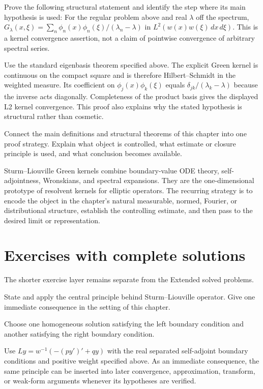 \begin{problem}\label{prob:iii26-problem-11}
Prove the following structural statement and identify the step where its main hypothesis is used: For the regular problem above and real $\lambda$ off the spectrum, $G_\lambda(x,\xi)=\sum_n\phi_n(x)\phi_n(\xi)/(\lambda_n-\lambda)$ in $L^2(w(x)w(\xi)\,dx\,d\xi)$. This is a kernel convergence assertion, not a claim of pointwise convergence of arbitrary spectral series.
\end{problem}
\begin{solution}
Use the standard eigenbasis theorem specified above. The explicit Green kernel is continuous on the compact square and is therefore Hilbert--Schmidt in the weighted measure. Its coefficient on $\phi_j(x)\phi_k(\xi)$ equals $\delta_{jk}/(\lambda_k-\lambda)$ because the inverse acts diagonally. Completeness of the product basis gives the displayed L2 kernel convergence. This proof also explains why the stated hypothesis is structural rather than cosmetic.
\end{solution}

\begin{problem}\label{prob:iii26-problem-12}
Connect the main definitions and structural theorems of this chapter into one proof strategy. Explain what object is controlled, what estimate or closure principle is used, and what conclusion becomes available.
\end{problem}
\begin{solution}
Sturm--Liouville Green kernels combine boundary-value ODE theory, self-adjointness, Wronskians, and spectral expansions. They are the one-dimensional prototype of resolvent kernels for elliptic operators. The recurring strategy is to encode the object in the chapter's natural measurable, normed, Fourier, or distributional structure, establish the controlling estimate, and then pass to the desired limit or representation.
\end{solution}
\section{Exercises with complete solutions}
The shorter exercise layer remains separate from the Extended solved problems.

\begin{exercise}\label{exr:iii26-01}
State and apply the central principle behind Sturm--Liouville operator. Give one immediate consequence in the setting of this chapter.
\end{exercise}
\begin{hint}
Choose one homogeneous solution satisfying the left boundary condition and another satisfying the right boundary condition.
\end{hint}
\begin{solution}
Use $Ly=w^{-1}(-(py')'+qy)$ with the real separated self-adjoint boundary conditions and positive weight specified above. As an immediate consequence, the same principle can be inserted into later convergence, approximation, transform, or weak-form arguments whenever its hypotheses are verified.
\end{solution}

